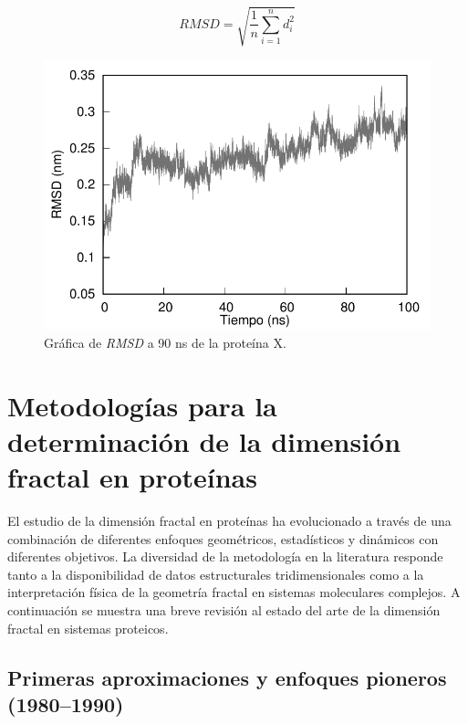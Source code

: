 	\begin{figure}[H]
	\hspace{-0.3cm} 
	\begin{minipage}{0.49\textwidth}
		\centering
		\begin{equation}
			RMSD = \sqrt{\frac{1}{n} \sum_{i=1}^{n} d_i^2}
			\label{rmsd}
		\end{equation}
	\end{minipage}
	\hspace{0.2cm}
	\begin{minipage}{0.49\textwidth}
		\centering
		\includegraphics[width=\linewidth]{graphs/rmsd.pdf}
	\end{minipage}
	\caption{Gráfica de \textit{RMSD} a 90 ns de la proteína X.}
	\label{rmsd-graf}
	\end{figure}


\section{Metodologías para la determinación de la dimensión fractal en proteínas}

El estudio de la dimensión fractal en proteínas ha evolucionado a través de una combinación de diferentes enfoques geométricos, estadísticos y dinámicos con diferentes objetivos. La diversidad de la metodología en la literatura responde tanto a la disponibilidad de datos estructurales tridimensionales como a la interpretación física de la geometría fractal en sistemas moleculares complejos. A continuación se muestra una breve revisión al estado del arte de la dimensión fractal en sistemas proteicos.

\subsection{Primeras aproximaciones y enfoques pioneros (1980--1990)}

